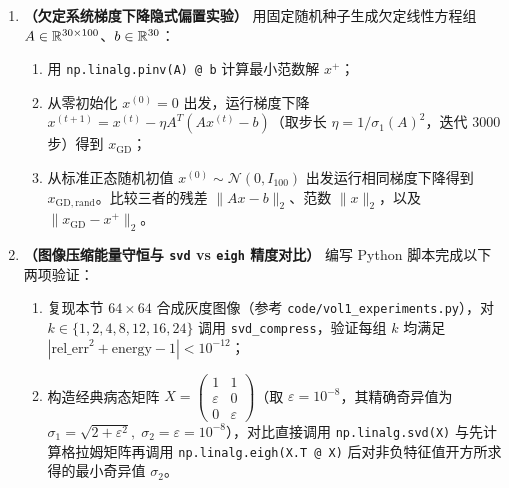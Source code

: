 \begin{enumerate}[label=\textbf{4.\arabic*}, leftmargin=2.4em, resume]
  \item \textbf{（欠定系统梯度下降隐式偏置实验）} 用固定随机种子生成欠定线性方程组 $A \in \mathbb{R}^{30\times 100}$、$b \in \mathbb{R}^{30}$：
  \begin{enumerate}[label=(\arabic*), leftmargin=1.8em]
    \item 用 \texttt{np.linalg.pinv(A) @ b} 计算最小范数解 $x^+$；
    \item 从零初始化 $x^{(0)} = 0$ 出发，运行梯度下降 $x^{(t+1)} = x^{(t)} - \eta A^T(A x^{(t)} - b)$（取步长 $\eta = 1/\sigma_1(A)^2$，迭代 $3000$ 步）得到 $x_{\mathrm{GD}}$；
    \item 从标准正态随机初值 $x^{(0)} \sim \mathcal{N}(0, I_{100})$ 出发运行相同梯度下降得到 $x_{\mathrm{GD,rand}}$。比较三者的残差 $\|Ax - b\|_2$、范数 $\|x\|_2$，以及 $\|x_{\mathrm{GD}} - x^+\|_2$。
  \end{enumerate}
  \par\smallskip{}

  \item \textbf{（图像压缩能量守恒与 \texttt{svd} vs \texttt{eigh} 精度对比）} 编写 Python 脚本完成以下两项验证：
  \begin{enumerate}[label=(\arabic*), leftmargin=1.8em]
    \item 复现本节 $64\times 64$ 合成灰度图像（参考 \texttt{code/vol1\_experiments.py}），对 $k \in \{1,2,4,8,12,16,24\}$ 调用 \texttt{svd\_compress}，验证每组 $k$ 均满足 $|\text{rel\_err}^2 + \text{energy} - 1| < 10^{-12}$；
    \item 构造经典病态矩阵 $X = \begin{pmatrix} 1 & 1 \\ \varepsilon & 0 \\ 0 & \varepsilon \end{pmatrix}$（取 $\varepsilon = 10^{-8}$，其精确奇异值为 $\sigma_1 = \sqrt{2 + \varepsilon^2},\; \sigma_2 = \varepsilon = 10^{-8}$），对比直接调用 \texttt{np.linalg.svd(X)} 与先计算格拉姆矩阵再调用 \texttt{np.linalg.eigh(X.T @ X)} 后对非负特征值开方所求得的最小奇异值 $\sigma_2$。
  \end{enumerate}
  \par\smallskip{}
\end{enumerate}

